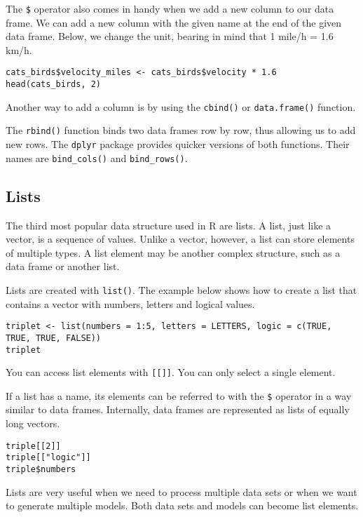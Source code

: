\documentclass[]{book}
\theoremstyle{definition}
\theoremstyle{definition}
\theoremstyle{definition}
\theoremstyle{remark}
\begin{document}
The \texttt{\$} operator also comes in handy when we add a new column to
our data frame. We can add a new column with the given name at the end
of the given data frame. Below, we change the unit, bearing in mind that
1 mile/h = 1.6 km/h.

\begin{verbatim}
cats_birds$velocity_miles <- cats_birds$velocity * 1.6
head(cats_birds, 2)
\end{verbatim}

Another way to add a column is by using the \texttt{cbind()} or
\texttt{data.frame()} function.

The \texttt{rbind()} function binds two data frames row by row, thus
allowing us to add new rows. The \texttt{dplyr} package provides quicker
versions of both functions. Their names are \texttt{bind\_cols()} and
\texttt{bind\_rows()}.

\subsection{Lists}\label{part_223}

The third most popular data structure used in R are lists. A list, just
like a vector, is a sequence of values. Unlike a vector, however, a list
can store elements of multiple types. A list element may be another
complex structure, such as a data frame or another list.

Lists are created with \texttt{list()}. The example below shows how to
create a list that contains a vector with numbers, letters and logical
values.

\begin{verbatim}
triplet <- list(numbers = 1:5, letters = LETTERS, logic = c(TRUE, TRUE, TRUE, FALSE))
triplet
\end{verbatim}

You can access list elements with \texttt{{[}{[}{]}{]}}. You can only
select a single element.

If a list has a name, its elements can be referred to with the
\texttt{\$} operator in a way similar to data frames. Internally, data
frames are represented as lists of equally long vectors.

\begin{verbatim}
triple[[2]]
triple[["logic"]]
triple$numbers
\end{verbatim}

Lists are very useful when we need to process multiple data sets or when
we want to generate multiple models. Both data sets and models can
become list elements.
\end{document}
